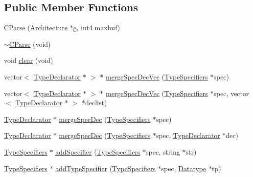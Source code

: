 \subsection*{Public Member Functions}
\begin{DoxyCompactItemize}
\item 
\mbox{\hyperlink{class_c_parse_ac70e0b56ec51d0e8dcd58b210524c6e3}{C\+Parse}} (\mbox{\hyperlink{class_architecture}{Architecture}} $\ast$g, int4 maxbuf)
\item 
\mbox{\hyperlink{class_c_parse_a432a5efb7cef89119725886d95a7e99a}{$\sim$\+C\+Parse}} (void)
\item 
void \mbox{\hyperlink{class_c_parse_a31d28fe36d46c4a203e5fc919f85bc89}{clear}} (void)
\item 
vector$<$ \mbox{\hyperlink{class_type_declarator}{Type\+Declarator}} $\ast$ $>$ $\ast$ \mbox{\hyperlink{class_c_parse_affe40bb9253984787da05af88523d256}{merge\+Spec\+Dec\+Vec}} (\mbox{\hyperlink{struct_type_specifiers}{Type\+Specifiers}} $\ast$spec)
\item 
vector$<$ \mbox{\hyperlink{class_type_declarator}{Type\+Declarator}} $\ast$ $>$ $\ast$ \mbox{\hyperlink{class_c_parse_afaf4be69d1d31f3e1f391aad486f2f3f}{merge\+Spec\+Dec\+Vec}} (\mbox{\hyperlink{struct_type_specifiers}{Type\+Specifiers}} $\ast$spec, vector$<$ \mbox{\hyperlink{class_type_declarator}{Type\+Declarator}} $\ast$ $>$ $\ast$declist)
\item 
\mbox{\hyperlink{class_type_declarator}{Type\+Declarator}} $\ast$ \mbox{\hyperlink{class_c_parse_a98ccafc1e14edd4385106826cbbc9fe3}{merge\+Spec\+Dec}} (\mbox{\hyperlink{struct_type_specifiers}{Type\+Specifiers}} $\ast$spec)
\item 
\mbox{\hyperlink{class_type_declarator}{Type\+Declarator}} $\ast$ \mbox{\hyperlink{class_c_parse_a6191ca3b85862bdd8a74da0d9d02af38}{merge\+Spec\+Dec}} (\mbox{\hyperlink{struct_type_specifiers}{Type\+Specifiers}} $\ast$spec, \mbox{\hyperlink{class_type_declarator}{Type\+Declarator}} $\ast$dec)
\item 
\mbox{\hyperlink{struct_type_specifiers}{Type\+Specifiers}} $\ast$ \mbox{\hyperlink{class_c_parse_a594d76f7b8af0948928585d112412e34}{add\+Specifier}} (\mbox{\hyperlink{struct_type_specifiers}{Type\+Specifiers}} $\ast$spec, string $\ast$str)
\item 
\mbox{\hyperlink{struct_type_specifiers}{Type\+Specifiers}} $\ast$ \mbox{\hyperlink{class_c_parse_ad76297f3360b0c10be30d77aa3883a9e}{add\+Type\+Specifier}} (\mbox{\hyperlink{struct_type_specifiers}{Type\+Specifiers}} $\ast$spec, \mbox{\hyperlink{class_datatype}{Datatype}} $\ast$tp)

\end{DoxyCompactItemize}
